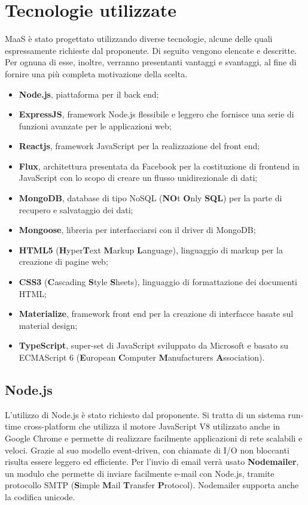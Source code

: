 \section{Tecnologie utilizzate}
MaaS \`e stato progettato utilizzando diverse tecnologie, alcune delle quali espressamente richieste dal proponente. Di seguito vengono elencate e descritte. Per ognuna di esse, inoltre, verranno presentanti vantaggi e svantaggi, al fine di fornire una pi\`u completa motivazione della scelta.
\begin{itemize}
\item \textbf{Node.js}, piattaforma per il back end;
\item \textbf{ExpressJS}, framework Node.js flessibile e leggero che fornisce una serie di funzioni avanzate per le applicazioni web;
\item \textbf{Reactjs}, framework JavaScript per la realizzazione del front end;
\item \textbf{Flux}, architettura presentata da Facebook per la costituzione di frontend in JavaScript con lo scopo di creare un flusso unidirezionale di dati;
\item \textbf{MongoDB}, database di tipo NoSQL (\textbf{NO}t \textbf{O}nly \textbf{SQL}) per la parte di recupero e salvataggio dei dati;
\item \textbf{Mongoose}, libreria per interfacciarsi con il driver di MongoDB;
\item \textbf{HTML5} (\textbf{H}yper\textbf{T}ext \textbf{M}arkup \textbf{L}anguage), linguaggio di markup per la creazione di pagine web;
\item \textbf{CSS3} (\textbf{C}ascading \textbf{S}tyle \textbf{S}heets), linguaggio di formattazione dei documenti HTML;
\item \textbf{Materialize}, framework front end per la creazione di interfacce basate sul material design;
\item \textbf{TypeScript}, super-set di JavaScript sviluppato da Microsoft e basato su ECMAScript 6 (\textbf{E}uropean \textbf{C}omputer \textbf{M}anufacturers \textbf{A}ssociation).
\end{itemize}

\subsection{Node.js}
L'utilizzo di Node.js \`e stato richiesto dal proponente. Si tratta di un sistema run-time cross-platform che utilizza il motore JavaScript V8 utilizzato anche in Google Chrome e permette di realizzare facilmente applicazioni di rete scalabili e veloci. Grazie al suo modello event-driven, con chiamate di I/O non bloccanti risulta essere leggero ed efficiente. Per l'invio di email verrà usato \textbf{Nodemailer}, un modulo che permette di inviare facilmente e-mail con Node.js, tramite protocollo SMTP (\textbf{S}imple \textbf{M}ail \textbf{T}ransfer \textbf{P}rotocol). Nodemailer supporta anche la codifica unicode.

